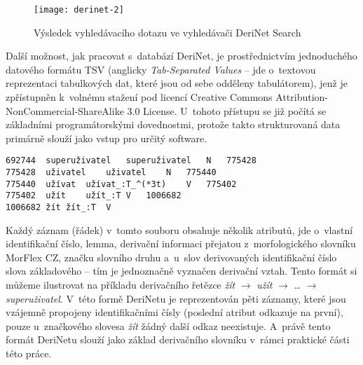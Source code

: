 \begin{figure}[ht]   
    \centering
    \texttt{[image: derinet-2]}  
    \caption{Výsledek vyhledávacího dotazu ve vyhledávači DeriNet Search \parencite{derinet}}
    \label{derinet-2}
 \end{figure}

Další možnost, jak pracovat s~databází DeriNet, je prostřednictvím
jednoduchého datového formátu TSV (anglicky \emph{Tab-Separated Values}
-- jde o~textovou reprezentaci tabulkových dat, které jsou od sebe
odděleny tabulátorem), jenž je zpřístupněn k~volnému stažení pod licencí
Creative Commons Attribution-NonCommercial-ShareAlike 3.0 License.
U~tohoto přístupu se již počítá se základními programátorskými
dovednostmi, protože takto strukturovaná data primárně slouží jako vstup
pro určitý software. \parencite{derinet-cz}

\begin{verbatim}
692744  superuživatel   superuživatel   N   775428
775428  uživatel    uživatel    N   775440
775440  užívat  užívat_:T_^(*3t)    V   775402
775402  užít    užít_:T V   1006682
1006682 žít žít_:T  V
\end{verbatim}

Každý záznam (řádek) v~tomto souboru obsahuje několik atributů, jde
o~vlastní identifikační číslo, lemma, derivační informaci přejatou
z~morfologického slovníku MorFlex CZ, značku slovního druhu a~u~slov
derivovaných identifikační číslo slova základového -- tím je jednoznačně
vyznačen derivační vztah. Tento formát si můžeme ilustrovat na příkladu
derivačního řetězce \emph{žít} $\rightarrow$ \emph{užít}
$\rightarrow$ \ldots{} $\rightarrow$ \emph{superuživatel}. V~této
formě DeriNetu je reprezentován pěti záznamy, které jsou vzájemně
propojeny identifikačními čísly (poslední atribut odkazuje na první),
pouze u~značkového slovesa \emph{žít} žádný další odkaz neexistuje.
\parencite{derinet} A~právě tento formát DeriNetu slouží jako základ
derivačního slovníku v~rámci praktické části této práce.
